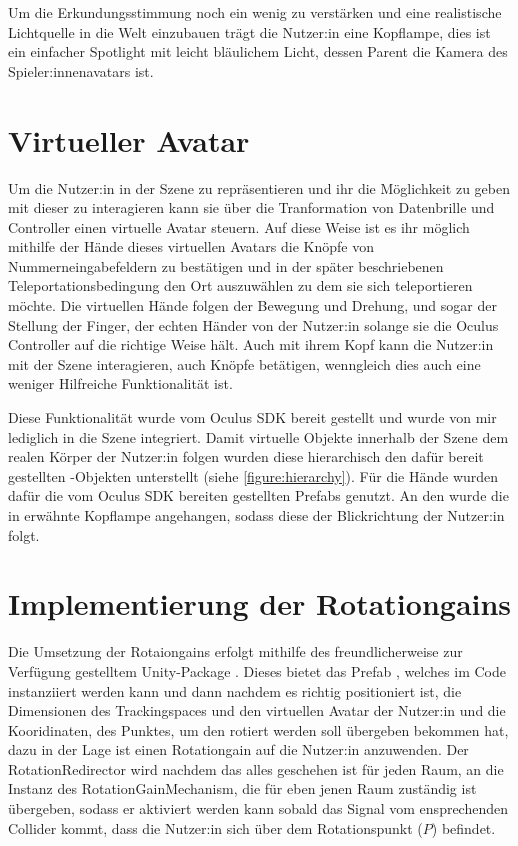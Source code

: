 Um die Erkundungsstimmung noch ein wenig zu verstärken und eine realistische Lichtquelle in die Welt einzubauen trägt die Nutzer:in eine Kopflampe, dies ist ein einfacher Spotlight mit leicht bläulichem Licht, dessen Parent die Kamera des Spieler:innenavatars ist.


\section{Virtueller Avatar}
Um die Nutzer:in in der Szene zu repräsentieren und ihr die Möglichkeit zu geben mit dieser zu interagieren kann sie über die Tranformation von Datenbrille und Controller einen virtuelle Avatar steuern. Auf diese Weise ist es ihr möglich mithilfe der Hände dieses virtuellen Avatars die Knöpfe von Nummerneingabefeldern zu bestätigen und in der später beschriebenen Teleportationsbedingung den Ort auszuwählen zu dem sie sich teleportieren möchte. Die virtuellen Hände folgen der Bewegung und Drehung, und sogar der Stellung der Finger, der echten Händer von der Nutzer:in solange sie die Oculus Controller auf die richtige Weise hält. Auch mit ihrem Kopf kann die Nutzer:in mit der Szene interagieren, auch Knöpfe betätigen, wenngleich dies auch eine weniger Hilfreiche Funktionalität ist.

Diese Funktionalität wurde vom Oculus SDK bereit gestellt und wurde von mir lediglich in die Szene integriert. %
Damit virtuelle Objekte innerhalb der Szene dem realen Körper der Nutzer:in folgen wurden diese hierarchisch den dafür bereit gestellten -Objekten unterstellt (siehe \autoref{figure:hierarchy}). Für die Hände wurden dafür die vom Oculus SDK bereiten gestellten Prefabs genutzt. %
An den  wurde die in  erwähnte Kopflampe angehangen, sodass diese der Blickrichtung der Nutzer:in folgt.

\section{Implementierung der Rotationgains}

Die Umsetzung der Rotaiongains erfolgt mithilfe des
freundlicherweise zur Verfügung gestelltem Unity-Package . Dieses bietet das Prefab , welches im Code instanziiert werden kann und dann nachdem es richtig positioniert ist, die Dimensionen des Trackingspaces und den virtuellen Avatar der Nutzer:in und die Kooridinaten, des Punktes, um den rotiert werden soll übergeben bekommen hat, dazu in der Lage ist einen Rotationgain auf die Nutzer:in anzuwenden. Der RotationRedirector wird nachdem das alles geschehen ist für jeden Raum, an die Instanz des RotationGainMechanism, die für eben jenen Raum zuständig ist übergeben, sodass er aktiviert werden kann sobald das Signal vom ensprechenden Collider kommt, dass die Nutzer:in sich über dem Rotationspunkt ($P$) befindet.

